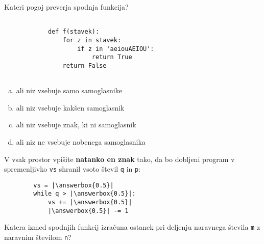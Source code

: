 \documentclass[arhiv, 10pt]{../izpit}
\newcommand{\inlinepy}[1]{\texttt{#1}}
\newcommand{\answerbox}[1]{\framebox{\vphantom{\large M}\hspace{#1cm}}}
\begin{document}
        \naloga*

        \begin{multicols}{2}
        \noindent
        Kateri pogoj preverja spodnja funkcija?
        \begin{verbatim}
        
            def f(stavek):
                for z in stavek:
                    if z in 'aeiouAEIOU':
                        return True
                return False
            
        \end{verbatim}

        \begin{enumerate}[(a)]
\item ali niz vsebuje samo samoglasnike
\item ali niz vsebuje kakšen samoglasnik
\item ali niz vsebuje znak, ki ni samoglasnik
\item ali niz ne vsebuje nobenega samoglasnika
\end{enumerate}

        \end{multicols}
    
        \naloga*
        \begin{multicols}{2}
        \noindent
        V vsak prostor vpišite \textbf{natanko en znak} tako, da bo dobljeni program v spremenljivko \inlinepy{vs} shranil vsoto števil \inlinepy{q} in \inlinepy{p}:
        
        \columnbreak
        \begin{verbatim}
        vs = |\answerbox{0.5}|
        while q > |\answerbox{0.5}|:
            vs += |\answerbox{0.5}|
            |\answerbox{0.5}| -= 1
        \end{verbatim}
        \end{multicols}
    
        \clearpage
        \naloga
        
        Katera izmed spodnjih funkcij izračuna ostanek pri deljenju naravnega števila \inlinepy{m} z naravnim številom \inlinepy{n}?
    
\end{document}
